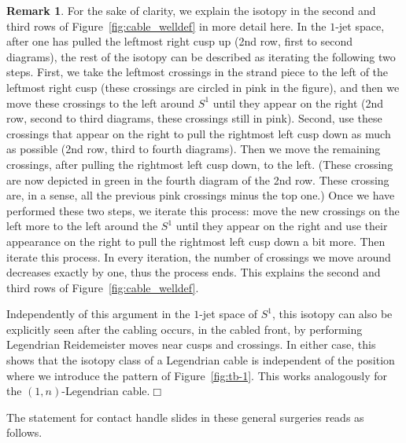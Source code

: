 \documentclass[11pt]{amsart} %
\theoremstyle{plain}
\theoremstyle{definition}
\newtheorem{rem}[Theorem]{Remark}
\begin{document}
\begin{rem} For the sake of clarity, we explain the isotopy in the second and third rows of Figure~\ref{fig:cable_welldef} in more detail here. In the $1$-jet space, after one has pulled the leftmost right cusp up (2nd row, first to second diagrams), the rest of the isotopy can be described as iterating the following two steps. First, we take the leftmost crossings in the strand piece to the left of the leftmost right cusp (these crossings are circled in pink in the figure), and then we move these crossings to the left around $S^1$ until they appear on the right (2nd row, second to third diagrams, these crossings still in pink). Second, use these crossings that appear on the right to pull the rightmost left cusp down as much as possible (2nd row, third to fourth diagrams). Then we move the remaining crossings, after pulling the rightmost left cusp down, to the left. (These crossing are now depicted in green in the fourth diagram of the 2nd row. These crossing are, in a sense, all the previous pink crossings minus the top one.) Once we have performed these two steps, we iterate this process: move the new crossings on the left more to the left around the $S^1$ until they appear on the right and use their appearance on the right to pull the rightmost left cusp down a bit more. Then iterate this process. In every iteration, the number of crossings we move around decreases exactly by one, thus the process ends. This explains the second and third rows of Figure~\ref{fig:cable_welldef}.
	
Independently of this argument in the $1$-jet space of $S^1$, this isotopy can also be explicitly seen after the cabling occurs, in the cabled front, by performing Legendrian Reidemeister moves near cusps and crossings. In either case, this shows that the isotopy class of a Legendrian cable is independent of the position where we introduce the pattern of Figure~\ref{fig:tb-1}. This works analogously for the $(1,n)$-Legendrian cable.\hfill$\Box$
\end{rem}

The statement for contact handle slides in these general surgeries reads as follows.
\end{document}
